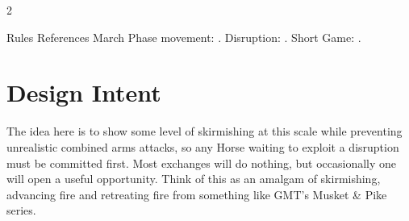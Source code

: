 \begin{multicols}{2}
\begin{rulebox}{Rules References}
March Phase movement: . Disruption: . Short Game:
.
\end{rulebox}

\section{Design Intent}

The idea here is to show some level of skirmishing at this scale while
preventing unrealistic combined arms attacks, so any Horse waiting to exploit a
disruption must be committed first. Most exchanges will do nothing, but
occasionally one will open a useful opportunity. Think of this as an amalgam of
skirmishing, advancing fire and retreating fire from something like GMT's
Musket \& Pike series.
\end{multicols}
